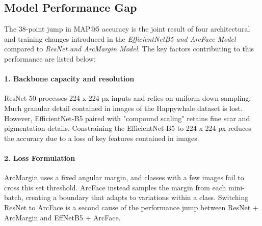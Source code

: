 \documentclass[twocolumn]{article}
\begin{document}
\subsection{Model Performance Gap}

The 38-point jump in MAP@5 accuracy is the joint result of four architectural and training changes introduced in the \textit{EfficientNetB5 and ArcFace Model} compared to \textit{ResNet and ArcMargin Model}. The key factors contributing to this performance are listed below:

\begin{table}[H]
\centering
{}
\caption{Comparison of model strategy components contributing to performance.}
\label{tab:model_strategy_comparison}
\end{table}


\paragraph{1. Backbone capacity and resolution}

ResNet-50 processes 224 x 224 px inputs and relies on uniform down-sampling. Much granular detail contained in images of the Happywhale dataset is lost. However, EfficientNet-B5 paired with "compound scaling" retains fine scar and pigmentation details. Constraining the EfficientNet-B5 to 224 x 224 px reduces the accuracy due to a loss of key features contained in images. 

\paragraph{2. Loss Formulation}

ArcMargin uses a fixed angular margin, and classes with a few images fail to cross this set threshold. ArcFace instead samples the margin from each mini-batch, creating a boundary that adapts to variations within a class. Switching ResNet to ArcFace is a second cause of the performance jump between ResNet + ArcMargin and EffNetB5 + ArcFace.
\end{document}
